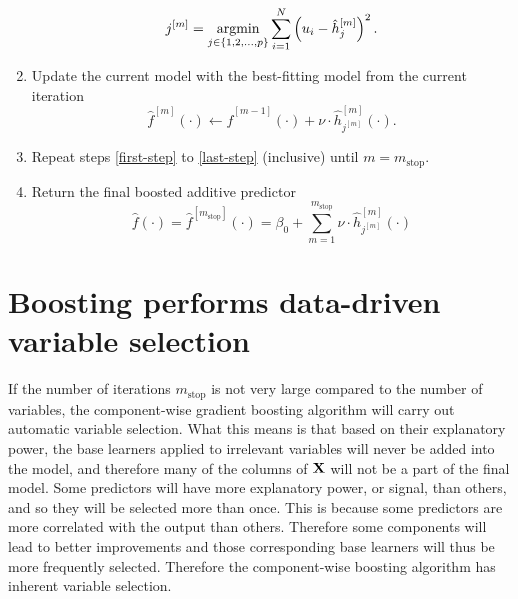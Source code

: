 \begin{algorithm}
\begin{enumerate}
        \begin{equation}
            j^{[m]}=\operatorname*{argmin}_{j\in\{1,2,\ldots,p\}}\sum_{i=1}^N \left(u_i-\hat{h}_j^{[m]}\right)^2.
        \end{equation}
    \item\label{last-step} Update the current model with the best-fitting model from the current iteration
        \begin{equation}
            \hat{f}^{[m]}(\cdot)\gets \hat{f}^{[m-1]}(\cdot)+\nu\cdot \hat{h}_{j^{[m]}}^{[m]}(\cdot).
        \end{equation}
    \item Repeat steps \ref{first-step} to \ref{last-step} (inclusive) until $m=m_{\text{stop}}$.
    \item Return the final boosted additive predictor
        \begin{equation}
            \hat{f}(\cdot)=\hat{f}^{[m_{\text{stop}}]}(\cdot)=\beta_0+\sum_{m=1}^{m_{\text{stop}}}\nu\cdot\hat{h}_{j^{[m]}}^{[m]}(\cdot)
        \end{equation}
\end{enumerate}
\end{algorithm}

\section{Boosting performs data-driven variable selection}
If the number of iterations $m_{\text{stop}}$ is not very large compared to the number of variables, the component-wise gradient boosting algorithm will carry out automatic variable selection. What this means is that based on their explanatory power, the base learners applied to irrelevant variables will never be added into the model, and therefore many of the columns of $\mathbf{X}$ will not be a part of the final model. Some predictors will have more explanatory power, or signal, than others, and so they will be selected more than once. This is because some predictors are more correlated with the output than others. Therefore some components will lead to better improvements and those corresponding base learners will thus be more frequently selected. Therefore the component-wise boosting algorithm has inherent variable selection.

